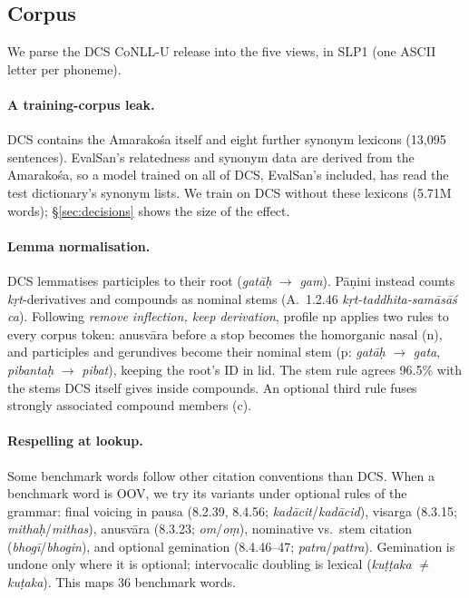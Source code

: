 \documentclass[11pt]{article}
\newcommand{\vk}[1]{\textsf{#1}}
\begin{document}
\subsection{Corpus}\label{sec:corpus}
We parse the DCS CoNLL-U release \citep{hellwig2010dcs} into the five
views, in SLP1 (one ASCII letter per phoneme).

\paragraph{A training-corpus leak.} DCS contains the Amarakośa itself and
eight further synonym lexicons (13,095 sentences). EvalSan's relatedness and
synonym data are derived from the Amarakośa, so a model trained on all of
DCS, EvalSan's included, has read the test dictionary's synonym lists. We
train on DCS without these lexicons (5.71M words); \S\ref{sec:decisions}
shows the size of the effect.

\paragraph{Lemma normalisation.} DCS lemmatises participles to their root
(\emph{gatāḥ} $\to$ \emph{gam}). Pāṇini instead counts \emph{kṛt}-derivatives
and compounds as nominal stems (A.~1.2.46 \emph{kṛt-taddhita-samāsāś ca}).
Following \emph{remove inflection, keep derivation}, profile \vk{np}
applies two rules to every corpus token: anusvāra before a stop becomes the
homorganic nasal (\vk{n}), and participles and gerundives become their
nominal stem (\vk{p}: \emph{gatāḥ} $\to$ \emph{gata}, \emph{pibantaḥ} $\to$
\emph{pibat}), keeping the root's ID in \vk{lid}. The stem rule agrees
96.5\% with the stems DCS itself gives inside compounds. An optional third
rule fuses strongly associated compound members (\vk{c}).

\paragraph{Respelling at lookup.} Some benchmark words follow other citation
conventions than DCS. When a benchmark word is OOV, we try its variants
under optional rules of the grammar: final voicing in pausa (8.2.39,
8.4.56; \emph{kadācit}/\emph{kadācid}), visarga (8.3.15;
\emph{mithaḥ}/\emph{mithas}), anusvāra (8.3.23; \emph{om}/\emph{oṃ}),
nominative vs.\ stem citation (\emph{bhogī}/\emph{bhogin}), and optional
gemination (8.4.46--47; \emph{patra}/\emph{pattra}). Gemination is undone
only where it is optional; intervocalic doubling is lexical
(\emph{kuṭṭaka} $\neq$ \emph{kuṭaka}). This maps 36 benchmark words.
\end{document}
